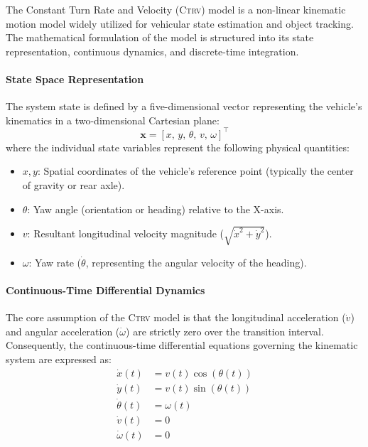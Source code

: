 The Constant Turn Rate and Velocity (\textsc{Ctrv}) model is a non-linear kinematic motion model widely utilized for vehicular state estimation and object tracking.%
The mathematical formulation of the model is structured into its state representation, continuous dynamics, and discrete-time integration.

\paragraph{State Space Representation}
The system state is defined by a five-dimensional vector representing the vehicle's kinematics in a two-dimensional Cartesian plane:
\begin{equation}
	\mathbf{x} = [x, \, y, \, \theta, \, v, \, \omega]^\top
	\label{eq:ctrv_state}
\end{equation}
where the individual state variables represent the following physical quantities:
\begin{itemize}
	\item $x, y$: Spatial coordinates of the vehicle's reference point (typically the center of gravity or rear axle).
	\item $\theta$: Yaw angle (orientation or heading) relative to the X-axis.
	\item $v$: Resultant longitudinal velocity magnitude ($\sqrt{\dot{x}^2 + \dot{y}^2}$).
	\item $\omega$: Yaw rate ($\dot{\theta}$, representing the angular velocity of the heading).
\end{itemize}

\paragraph{Continuous-Time Differential Dynamics}
The core assumption of the \textsc{Ctrv} model is that the longitudinal acceleration ($\dot{v}$) and angular acceleration ($\dot{\omega}$) are strictly zero over the transition interval. Consequently, the continuous-time differential equations governing the kinematic system are expressed as:
\begin{align}
	\dot{x}(t) &= v(t) \cos(\theta(t)) \\
	\dot{y}(t) &= v(t) \sin(\theta(t)) \\
	\dot{\theta}(t) &= \omega(t) \\
	\dot{v}(t) &= 0 \\
	\dot{\omega}(t) &= 0
\end{align}

